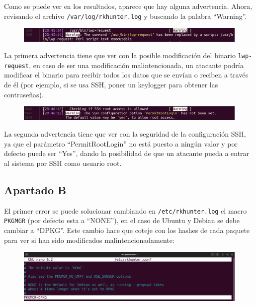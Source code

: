 \documentclass{article}
\begin{document}
Como se puede ver en los resultados, aparece que hay alguna advertencia. Ahora, revisando el archivo \verb|/var/log/rkhunter.log| y buscando la palabra ``Warning''.

\begin{figure}[H]
    \includegraphics[width=\textwidth]{imagenes/warn1.png}
\end{figure}

La primera advertencia tiene que ver con la posible modificación del binario \verb|lwp-request|, en caso de ser una modificación malintencionada, un atacante podría modificar el binario para recibir todos los datos que se envían o reciben a través de él (por ejemplo, si se usa SSH, poner un keylogger para obtener las contraseñas).

\begin{figure}[H]
    \includegraphics[width=\textwidth]{imagenes/warn2.png}
\end{figure}

La segunda advertencia tiene que ver con la seguridad de la configuración SSH, ya que el parámetro ``PermitRootLogin'' no está puesto a ningún valor y por defecto puede ser ``Yes'', dando la posibilidad de que un atacante pueda a entrar al sistema por SSH como usuario root.


\subsection*{Apartado B}
El primer error se puede solucionar cambiando en \verb|/etc/rkhunter.log| el macro \verb|PKGMGR| (por defecto esta a ``NONE''), en el caso de Ubuntu y Debian se debe cambiar a ``DPKG''. Este cambio hace que coteje con los hashes de cada paquete para ver si han sido modificados malintencionadamente:

\begin{figure}[H]
    \includegraphics[width=\textwidth]{imagenes/rkhuntermacrodpkg.png}
\end{figure}
\end{document}
